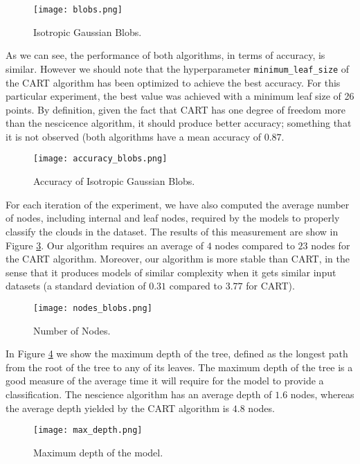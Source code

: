 \begin{figure}[h]
\centering
\texttt{[image: blobs.png]}
\caption{Isotropic Gaussian Blobs.}
\label{figure:blobs}
\end{figure}

As we can see, the performance of both algorithms, in terms of accuracy, is similar. However we should note that the hyperparameter \texttt{minimum\_leaf\_size} of the CART algorithm has been optimized to achieve the best accuracy. For this particular experiment, the best value was achieved with a minimum leaf size of 26 points. By definition, given the fact that CART has one degree of freedom more than the nescicence algorithm, it should produce better accuracy; something that it is not observed (both algorithms have a mean accuracy of $0.87$.

\begin{figure}[h]
\centering
\texttt{[image: accuracy\_blobs.png]}
\caption{Accuracy of Isotropic Gaussian Blobs.}
\label{figure:accuracy_blobs}
\end{figure}

For each iteration of the experiment, we have also computed the average number of nodes, including internal and leaf nodes, required by the models to properly classify the clouds in the dataset. The results of this measurement are show in Figure \ref{figure:length_nodes}. Our algorithm requires an average of $4$ nodes compared to $23$ nodes for the CART algorithm. Moreover, our algorithm is more stable than CART, in the sense that it produces models of similar complexity when it gets similar input datasets (a standard deviation of $0.31$ compared to $3.77$ for CART).

\begin{figure}[h]
\centering
\texttt{[image: nodes\_blobs.png]}
\caption{Number of Nodes.}
\label{figure:length_nodes}
\end{figure}

In Figure \ref{figure:blob_max_depth} we show the maximum depth of the tree, defined as the longest path from the root of the tree to any of its leaves. The maximum depth of the tree is a good measure of the average time it will require for the model to provide a classification. The nescience algorithm has an average depth of $1.6$ nodes, whereas the average depth yielded by the CART algorithm is $4.8$ nodes.

\begin{figure}[h]
\centering
\texttt{[image: max\_depth.png]}
\caption{Maximum depth of the model.}
\label{figure:blob_max_depth}
\end{figure}

